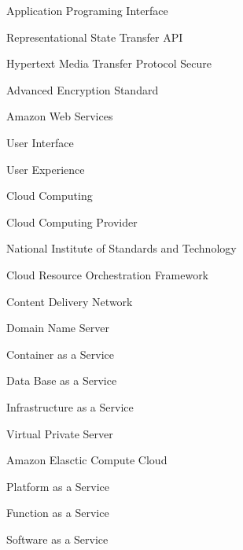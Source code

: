     {Application Programing Interface}

    {\gls{Representational State Transfer API}}

    {\gls{Hypertext Media Transfer Protocol Secure}}

    {Advanced Encryption Standard}
 
    {\gls{Amazon Web Services}}
  
    {\gls{User Interface}}

    {User Experience}

    {\gls{Cloud Computing}}

    {\gls{Cloud Computing Provider}}

    {National Institute of Standards and Technology}

    {Cloud Resource Orchestration Framework}

    {Content Delivery Network}

    {Domain Name Server}

    {Container as a Service}

    {Data Base as a Service}

    {Infrastructure as a Service}

    {Virtual Private Server}

    {Amazon Elasctic Compute Cloud}

    {Platform as a Service}

    {Function as a Service}

    {Software as a Service}